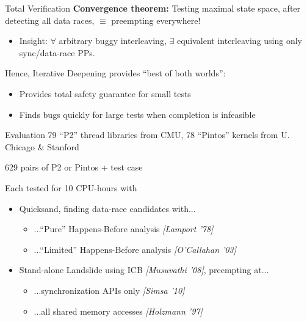 \documentclass[xcolor=dvipsnames]{beamer}
\begin{document}
\begin{frame}{Total Verification}
	\textbf{Convergence theorem:} Testing maximal state space, after detecting all data races, $\equiv$ preempting everywhere!
	\begin{itemize}
		\item Insight: $\forall$ arbitrary buggy interleaving, $\exists$ equivalent interleaving %
			using only sync/data-race PPs.
	\end{itemize}
	\linegap

	Hence, Iterative Deepening provides ``best of both worlds'':
	\begin{itemize}
		\item Provides total safety guarantee for small tests
		\item Finds bugs quickly for large tests when completion is infeasible
	\end{itemize}
\end{frame}

\begin{frame}{Evaluation}
	79 ``P2'' thread libraries from CMU, 78 ``Pintos'' kernels from U. Chicago \& Stanford
	\linegap

	629 pairs of P2 or Pintos + test case
	\linegap

	Each tested for 10 CPU-hours with
	\begin{itemize}
		\item Quicksand, finding data-race candidates with...
			\begin{itemize}
				\item ...``Pure'' Happens-Before analysis {\em [Lamport '78]}
				\item ...``Limited'' Happens-Before analysis {\em [O'Callahan '03]}
			\end{itemize}
		\item Stand-alone Landslide using ICB {\em [Musuvathi '08]}, preempting at...
			\begin{itemize}
				\item ...synchronization APIs only {\em [Simsa '10]}
				\item ...all shared memory accesses {\em [Holzmann '97]}
			\end{itemize}
	\end{itemize}
\end{frame}
\end{document}
